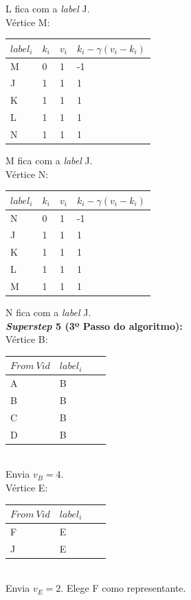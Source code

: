 \documentclass[a4paper,10pt]{report}
\begin{document}
  L fica com a \textit{label} J.
\\[0.25cm]
Vértice M:
  \begin{tabular}{| l | l | l | l |}
  \hline
  $label_i$ & $k_i$ & $v_i$ & $k_i - \gamma(v_i - k_i)$\\ \hline
  M & 0 & 1 & -1 \\ \hline
  J & 1 & 1 & 1  \\ \hline
  K & 1 & 1 & 1  \\ \hline
  L & 1 & 1 & 1  \\ \hline
  N & 1 & 1 & 1  \\ \hline
  \end{tabular}  
  M fica com a \textit{label} J.
\\[0.25cm]
Vértice N:
  \begin{tabular}{| l | l | l | l |}
  \hline
  $label_i$ & $k_i$ & $v_i$ & $k_i - \gamma(v_i - k_i)$\\ \hline
  N & 0 & 1 & -1 \\ \hline
  J & 1 & 1 & 1  \\ \hline
  K & 1 & 1 & 1  \\ \hline
  L & 1 & 1 & 1  \\ \hline
  M & 1 & 1 & 1  \\ \hline
  \end{tabular}  
  N fica com a \textit{label} J.
\\[0.25cm]
\newpage
{\bf \textit{Superstep} 5 (3º Passo do algoritmo):} 
\\[0.25cm]
Vértice B:
  \begin{tabular}{| l | l | l | l |}
  \hline
  $From~Vid$ & $label_i$\\ \hline
  A & B \\ \hline
  B & B \\ \hline
  C & B \\ \hline
  D & B \\ \hline
  \end{tabular}  
\\[0.25cm]
  Envia $v_B = 4$.
\\[0.25cm]
Vértice E:
  \begin{tabular}{| l | l | l | l |}
  \hline
  $From~Vid$ & $label_i$\\ \hline
  F & E \\ \hline
  J & E \\ \hline
  \end{tabular}  
\\[0.25cm]
  Envia $v_E = 2$. Elege F como representante.
\\[0.25cm]
\end{document}
